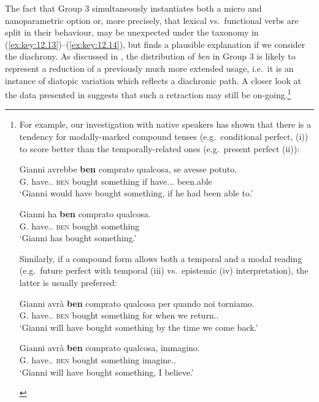\documentclass[output=paper]{langsci/langscibook}
\begin{document}
\largerpage[-9]
The fact that Group 3 simultaneously instantiates both a micro and
nanoparametric option or, more precisely, that lexical vs.\ functional verbs are
split in their behaviour, may be unexpected under the taxonomy in (\ref{ex:key:12.13})--(\ref{ex:key:12.14}),
but finds a plausible explanation if we consider the diachrony. As discussed in
, the distribution of \emph{ben} in Group 3 is likely to represent a
reduction of a previously much more extended usage, i.e.\ it is an instance of
diatopic variation which reflects a diachronic path. A closer look at the data
presented in \textcite{CognSchi2018b,CognSchi2018} suggests that such a
retraction may still be on-going.\footnote{For example, our investigation with
    native speakers has shown that there is a tendency for modally-marked
    compound tenses (e.g.\ conditional perfect, (i)) to score better than the
    temporally-related ones (e.g.\ present perfect (ii)):

\begin{exe}
	\gll    Gianni avrebbe \textbf{ben} comprato qualcosa, se avesse potuto.\\
		    G. have.\Cond.\Tsg{} \textsc{ben} bought something if have.\Sbjv.\Ipfv.\Tsg{} been.able\\
	\glt    \enquote*{Gianni would have bought something, if he had been able to.}
\end{exe}

\begin{exe}
	\gll    Gianni ha \textbf{ben} comprato qualcosa.\\
		    G. have.\Prs.\Tsg{} \textsc{ben} bought something\\
	\glt    \enquote*{Gianni has bought something.}
\end{exe}

Similarly, if a compound form allows both a temporal and a modal reading (e.g.\
future perfect with temporal (iii) vs.\ epistemic (iv) interpretation), the
latter is usually preferred:

\begin{exe}
	\gll Gianni avrà \textbf{ben} comprato qualcosa per quando noi torniamo.\\
		G. have.\Fut.\Tsg{} \textsc{ben} bought something for when we return.\Prs{}.\Fpl{}\\
	\glt \enquote*{Gianni will have bought something by the time we come back.}
\end{exe}

\begin{exe}
	\gll Gianni avrà \textbf{ben} comprato qualcosa, immagino.\\
		G. have.\Fut.\Tsg{} \textsc{ben} bought something imagine.\Prs.\Fsg{}\\
	\glt \enquote*{Gianni will have bought something, I believe.}
\end{exe}

}
\end{document}
